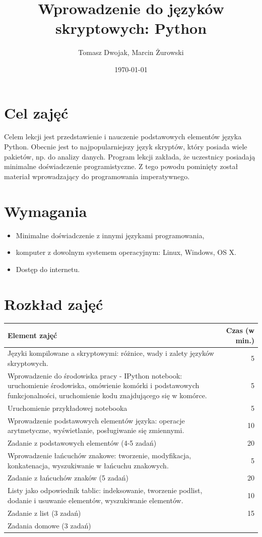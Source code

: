 \documentclass{mwart}
\author{Tomasz Dwojak, Marcin Żurowski}
\title{Wprowadzenie do języków skryptowych: Python}
\date{\today}
\begin{document}
\maketitle

\section{Cel zajęć}
Celem lekcji jest przedstawienie i nauczenie podstawowych elementów języka Python.
Obecnie jest to najpopularniejszy język skryptów, który posiada wiele pakietów, np. do
analizy danych. Program lekcji zakłada, że uczestnicy posiadają minimalne
doświadczenie programistyczne. Z tego powodu pominięty został materiał wprowadzający do
programowania imperatywnego.

\section{Wymagania}
\begin{itemize}
  \item Minimalne doświadczenie z innymi językami programowania,
  \item komputer z dowolnym systemem operacyjnym: Linux, Windows, OS X.
  \item Dostęp do internetu.
\end{itemize}


\section{Rozkład zajęć}

\begin{center}
  \begin{tabular}{p{10cm}r}
  \toprule
  \textbf{Element zajęć}  & \textbf{Czas (w min.)}   \\
  \midrule
  Języki kompilowane  a skryptowymi: różnice, wady i zalety języków skryptowych. & 5 \\
  \midrule
  Wprowadzenie do środowiska pracy - IPython notebook: uruchomienie środowiska, omówienie
  komórki i podstawowych funkcjonalności, uruchomienie kodu znajdującego się w komórce.
  & 5 \\
  \midrule
  Uruchomienie przykładowej notebooka & 5 \\
  \midrule
  Wprowadzenie podstawowych elementów języka: operacje arytmetyczne, wyświetlanie,
  posługiwanie się zmiennymi. & 10 \\
  \midrule
  Zadanie z podstawowych elementów (4-5 zadań) & 20 \\
  \midrule
  Wprowadzenie łańcuchów znakowe: tworzenie, modyfikacja, konkatenacja, wyszukiwanie w
  łańcuchu znakowych. & 5 \\
  \midrule
  Zadanie z łańcuchów znaków (5 zadań) & 20 \\
  \midrule
  Listy jako odpowiednik tablic: indeksowanie, tworzenie podlist, dodanie i usuwanie
  elementów, wyszukiwanie elementów. & 10 \\
  \midrule
  Zadanie z list (3 zadań) & 15 \\
  \midrule
  Zadania domowe (3 zadań) & \\
  \bottomrule
\end{tabular}
\end{center}
\end{document}
